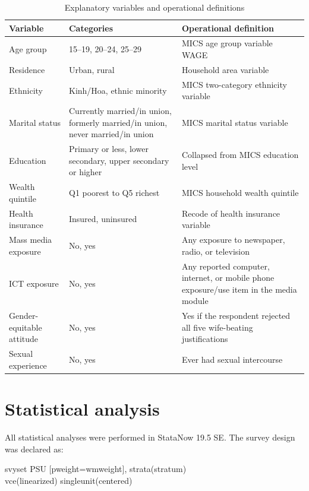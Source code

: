 \begin{table}[htbp]
\caption{Explanatory variables and operational definitions}
\centering
\small
\begin{tabular}{|p{3.3cm}|p{4.3cm}|p{5.6cm}|}
\hline
\textbf{Variable} & \textbf{Categories} & \textbf{Operational definition} \\
\hline
Age group & 15--19, 20--24, 25--29 & MICS age group variable WAGE \\
\hline
Residence & Urban, rural & Household area variable \\
\hline
Ethnicity & Kinh/Hoa, ethnic minority & MICS two-category ethnicity variable \\
\hline
Marital status & Currently married/in union, formerly married/in union, never married/in union & MICS marital status variable \\
\hline
Education & Primary or less, lower secondary, upper secondary or higher & Collapsed from MICS education level \\
\hline
Wealth quintile & Q1 poorest to Q5 richest & MICS household wealth quintile \\
\hline
Health insurance & Insured, uninsured & Recode of health insurance variable \\
\hline
Mass media exposure & No, yes & Any exposure to newspaper, radio, or television \\
\hline
ICT exposure & No, yes & Any reported computer, internet, or mobile phone exposure/use item in the media module \\
\hline
Gender-equitable attitude & No, yes & Yes if the respondent rejected all five wife-beating justifications \\
\hline
Sexual experience & No, yes & Ever had sexual intercourse \\
\hline
\end{tabular}
\label{tab:variables}
\end{table}

\section{Statistical analysis}

All statistical analyses were performed in StataNow 19.5 SE. The survey design was declared as:

\begin{flushleft}
\small\ttfamily
svyset PSU [pweight=wmweight], strata(stratum)\\
vce(linearized) singleunit(centered)
\end{flushleft}


